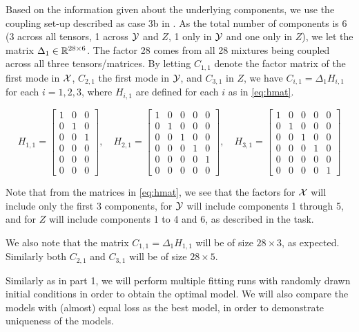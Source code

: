 Based on the information given about the underlying components, we use the coupling set-up described as case 3b in \textcite{framework}.
As the total number of components is 6 (3 across all tensors, 1 across $\mathcal{Y}$ and $Z$, 1 only in $\mathcal{Y}$ and one only in $Z$), we let the matrix $\Delta_1 \in \mathbb{R}^{28 \times 6}$.
The factor 28 comes from all 28 mixtures being coupled across all three tensors/matrices.
By letting $C_{1,1}$ denote the factor matrix of the first mode in $\mathcal{X}$, $C_{2,1}$ the first mode in $\mathcal{Y}$, and $C_{3,1}$ in $Z$, we have $C_{i, 1} = \Delta_1 H_{i,1}$ for each $i=1,2,3$, where $H_{i,1}$ are defined for each $i$ as in \eqref{eq:hmat}.

\begin{equation}
    H_{1,1} = \begin{bmatrix}
        1 & 0 & 0 \\
        0 & 1 & 0 \\
        0 & 0 & 1 \\
        0 & 0 & 0 \\
        0 & 0 & 0 \\
        0 & 0 & 0
    \end{bmatrix}, \quad
    H_{2,1} = \begin{bmatrix}
        1 & 0 & 0 & 0 & 0 \\
        0 & 1 & 0 & 0 & 0 \\
        0 & 0 & 1 & 0 & 0 \\
        0 & 0 & 0 & 1 & 0 \\
        0 & 0 & 0 & 0 & 1 \\
        0 & 0 & 0 & 0 & 0
    \end{bmatrix}, \quad
    H_{3,1} = \begin{bmatrix}
        1 & 0 & 0 & 0 & 0 \\
        0 & 1 & 0 & 0 & 0 \\
        0 & 0 & 1 & 0 & 0 \\
        0 & 0 & 0 & 1 & 0 \\
        0 & 0 & 0 & 0 & 0 \\
        0 & 0 & 0 & 0 & 1
    \end{bmatrix}
    \label{eq:hmat}
\end{equation}

Note that from the matrices in \eqref{eq:hmat}, we see that the factors for $\mathcal{X}$ will include only the first 3 components, for $\mathcal{Y}$ will include components 1 through 5, and for $Z$ will include components 1 to 4 and 6, as described in the task.

We also note that the matrix $C_{1,1} = \Delta_1 H_{1,1}$ will be of size $28 \times 3$, as expected.
Similarly both $C_{2,1}$ and $C_{3,1}$ will be of size $28 \times 5$.

Similarly as in part 1, we will perform multiple fitting runs with randomly drawn initial conditions in order to obtain the optimal model.
We will also compare the models with (almost) equal loss as the best model, in order to demonstrate uniqueness of the models.

